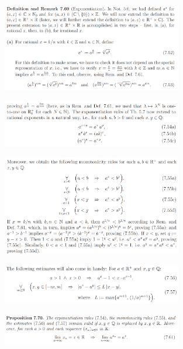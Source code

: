 \begin{figure}[H] \centering
\includegraphics[width=0.7\textwidth]{media/7-25.png}
\end{figure}
\begin{figure}[H] \centering
\includegraphics[width=0.7\textwidth]{media/7-25-2.png}
\end{figure}
\begin{figure}[H] \centering
\includegraphics[width=0.7\textwidth]{media/7-25-3.png}
\end{figure}
\begin{figure}[H] \centering
\includegraphics[width=0.7\textwidth]{media/7-25-4.png}
\end{figure}
\begin{figure}[H] \centering
\includegraphics[width=0.7\textwidth]{media/7-25-5.png}
\end{figure}

